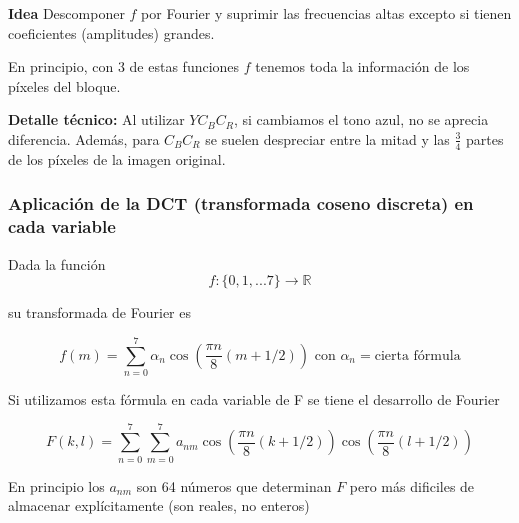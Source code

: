		\textbf{Idea} Descomponer $f$ por Fourier y suprimir las frecuencias altas excepto si tienen coeficientes (amplitudes) grandes.



		En principio, con 3 de estas funciones $f$ tenemos toda la información de los píxeles del bloque.

		\textbf{Detalle técnico:} Al utilizar $Y C_B C_R$, si cambiamos el tono azul, no se aprecia diferencia. Además, para $C_B C_R$ se suelen despreciar entre la mitad y las $\frac{3}{4}$ partes de los píxeles de la imagen original.


		\subsubsection{Aplicación de la DCT (transformada coseno discreta) en cada variable}

			Dada la función
			\[f: \{ 0,1,...7 \} \rightarrow \mathbb{R}\]

			su transformada de Fourier es

			$$ f(m) = \sum\limits^{7}_{n=0} \alpha_n \cos \left(\frac{\pi n}{8} (m + 1/2) \right) \text{ con } \alpha_n = \text{cierta fórmula} $$

			Si utilizamos esta fórmula en cada variable de F se tiene el desarrollo de Fourier

			$$ F(k,l) = \sum\limits^{7}_{n = 0} \sum\limits^{7}_{m = 0} a_{nm} \cos \left( \frac{\pi n}{8} (k+1/2)  \right) \cos \left( \frac{\pi n}{8} (l+1/2)  \right) $$


			En principio los $a_{nm}$ son 64 números que determinan $F$ pero más dificiles de almacenar explícitamente (son reales, no enteros)

